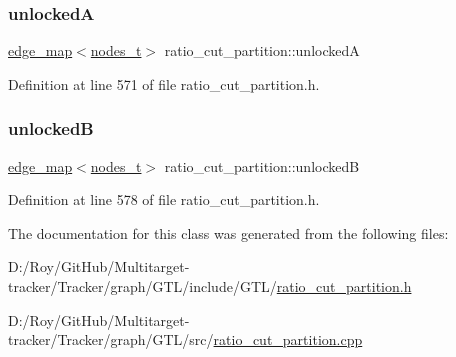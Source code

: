 \subsubsection{\texorpdfstring{unlockedA}{unlockedA}}
{\footnotesize\ttfamily \mbox{\hyperlink{classedge__map}{edge\+\_\+map}}$<$\mbox{\hyperlink{edge_8h_a22ac17689106ba21a84e7bc54d1199d6}{nodes\+\_\+t}}$>$ ratio\+\_\+cut\+\_\+partition\+::unlockedA\hspace{0.3cm}{\ttfamily [protected]}}



Definition at line 571 of file ratio\+\_\+cut\+\_\+partition.\+h.

\mbox{\label{classratio__cut__partition_af7c877d8c6e9b533ab34cde1c6690b25}} 
\subsubsection{\texorpdfstring{unlockedB}{unlockedB}}
{\footnotesize\ttfamily \mbox{\hyperlink{classedge__map}{edge\+\_\+map}}$<$\mbox{\hyperlink{edge_8h_a22ac17689106ba21a84e7bc54d1199d6}{nodes\+\_\+t}}$>$ ratio\+\_\+cut\+\_\+partition\+::unlockedB\hspace{0.3cm}{\ttfamily [protected]}}



Definition at line 578 of file ratio\+\_\+cut\+\_\+partition.\+h.



The documentation for this class was generated from the following files\+:\begin{DoxyCompactItemize}
\item 
D\+:/\+Roy/\+Git\+Hub/\+Multitarget-\/tracker/\+Tracker/graph/\+G\+T\+L/include/\+G\+T\+L/\mbox{\hyperlink{ratio__cut__partition_8h}{ratio\+\_\+cut\+\_\+partition.\+h}}\item 
D\+:/\+Roy/\+Git\+Hub/\+Multitarget-\/tracker/\+Tracker/graph/\+G\+T\+L/src/\mbox{\hyperlink{ratio__cut__partition_8cpp}{ratio\+\_\+cut\+\_\+partition.\+cpp}}\end{DoxyCompactItemize}
